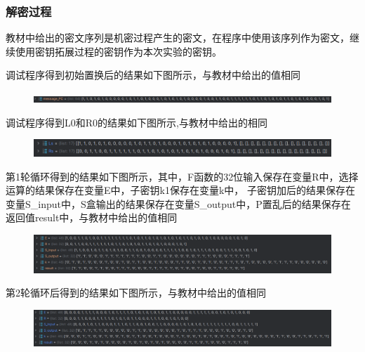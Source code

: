 \documentclass[a4paper,11pt,UTF8]{ctexart}
\newcommand{\bottomcaption}{%
\setlength{\abovecaptionskip}{6pt}%
\setlength{\belowcaptionskip}{6pt}%
\caption}
\newcommand{\xiaowuhao}{\fontsize{9pt}{\baselineskip}\selectfont}   %
\begin{document}
        \subsubsection{解密过程}
            教材中给出的密文序列是机密过程产生的密文，在程序中使用该序列作为密文，继续使用密钥拓展过程的密钥作为本次实验的密钥。\par
            调试程序得到初始置换后的结果如下图所示，与教材中给出的值相同
            \begin{figure}[H]
                \centering
                \includegraphics[width=15cm]{d初始置换.png}
                \bottomcaption{\xiaowuhao{初始置换后结果}}
            \end{figure}
            调试程序得到L0和R0的结果如下图所示,与教材中给出的相同
            \begin{figure}[H]
                \centering
                \includegraphics[width=15cm]{dL0R0.png}
                \bottomcaption{\xiaowuhao{得到L0和R0的结果}}
            \end{figure}
            第1轮循环得到的结果如下图所示，其中，F函数的32位输入保存在变量R中，选择运算的结果保存在变量E中，子密钥k1保存在变量k中，
            子密钥加后的结果保存在变量S\_input中，S盒输出的结果保存在变量S\_output中，P置乱后的结果保存在返回值result中，与教材中给出的值相同
            \begin{figure}[H]
                \centering
                \includegraphics[width=15cm]{dN1.png}
                \bottomcaption{\xiaowuhao{第1轮循环的结果}}
            \end{figure}
\newpage
            第2轮循环后得到的结果如下图所示，与教材中给出的值相同
            \begin{figure}[H]
                \centering
                \includegraphics[width=15cm]{dN2.png}
                \bottomcaption{\xiaowuhao{第2轮循环的结果}}
            \end{figure}
\end{document}
